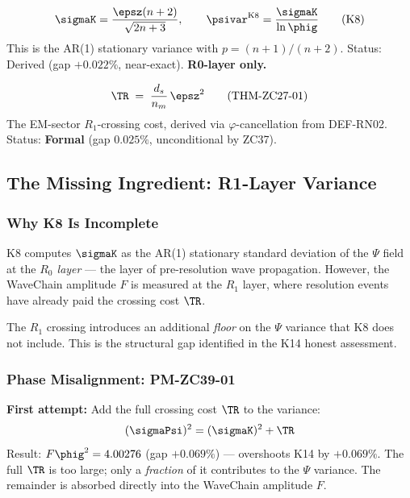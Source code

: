 \documentclass[12pt, a4paper]{article}
\begin{document}
\begin{formalbox}[title={Pillar 2: K8 --- WaveChain $\psivar$ at $R_0$ Layer (Part B)}]
\[
  \sigmaK = \frac{\epsz(n+2)}{\sqrt{2n+3}},
  \qquad
  \psivar^{\rm K8} = \frac{\sigmaK}{\ln\phig}
  \tag{K8}
\]
This is the AR(1) stationary variance with $p = (n+1)/(n+2)$.
Status: Derived (gap $+0.022\%$, near-exact). \textbf{R0-layer only.}
\end{formalbox}

\begin{formalbox}[title={Pillar 3: THM-ZC27-01 --- R1-Crossing Cost (ZC27)}]
\[
  \TR \;=\; \frac{d_s}{n_m}\,\epsz^2
  \tag{THM-ZC27-01}
\]
The EM-sector $R_1$-crossing cost, derived via $\varphi$-cancellation
from DEF-RN02. Status: \textbf{Formal} (gap $0.025\%$, unconditional by ZC37).
\end{formalbox}

\subsection{The Missing Ingredient: R1-Layer Variance}
\label{sec:missing}

\subsubsection{Why K8 Is Incomplete}

K8 computes $\sigmaK$ as the AR(1) stationary standard deviation
of the $\Psi$ field at the \emph{$R_0$ layer} ---
the layer of pre-resolution wave propagation.
However, the WaveChain amplitude $F$ is measured at the $R_1$ layer,
where resolution events have already paid the crossing cost $\TR$.

The $R_1$ crossing introduces an additional \emph{floor} on the
$\Psi$ variance that K8 does not include.
This is the structural gap identified in the K14 honest assessment.

\subsubsection{Phase Misalignment: PM-ZC39-01}

\begin{openqbox}[title={PM-ZC39-01: Full T(R1) Overshoots}]
\textbf{First attempt:} Add the full crossing cost $\TR$ to the variance:
\[
  (\sigmaPsi)^2 = (\sigmaK)^2 + \TR
\]
Result: $F\phig^2 = 4.00276$ (gap $+0.069\%$) --- overshoots K14 by $+0.069\%$.
The full $\TR$ is too large; only a \emph{fraction} of it contributes
to the $\Psi$ variance.
The remainder is absorbed directly into the WaveChain amplitude $F$.
\end{openqbox}
\end{document}
